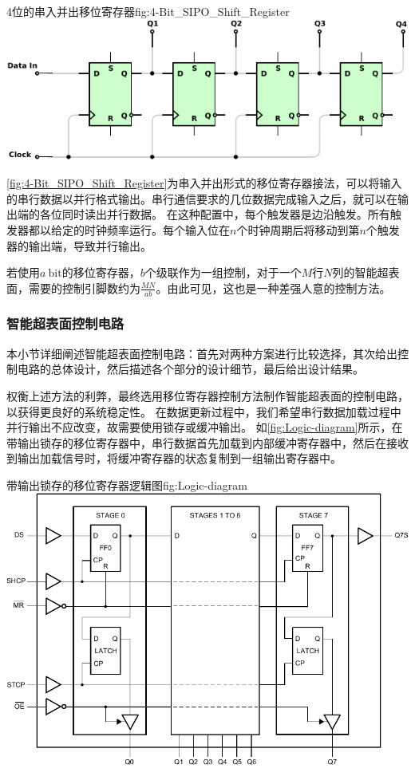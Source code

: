 \documentclass[supercite]{HustGraduPaper}
\begin{document}
\begin{generalfig}[htb]{4位的串入并出移位寄存器}{fig:4-Bit_SIPO_Shift_Register}
	\includegraphics[width=0.8\linewidth]{Figures/4-Bit_SIPO_Shift_Register.pdf}
\end{generalfig}

\autoref{fig:4-Bit_SIPO_Shift_Register}为串入并出形式的移位寄存器接法，可以将输入的串行数据以并行格式输出。串行通信要求的几位数据完成输入之后，就可以在输出端的各位同时读出并行数据。
在这种配置中，每个触发器是边沿触发。所有触发器都以给定的时钟频率运行。每个输入位在$n$个时钟周期后将移动到第$n$个触发器的输出端，导致并行输出。

若使用$a~\mathrm{bit}$的移位寄存器，$b$个级联作为一组控制，对于一个$M$行$N$列的智能超表面，需要的控制引脚数约为$\frac{MN}{ab}$。由此可见，这也是一种差强人意的控制方法。

\subsubsection{智能超表面控制电路}

本小节详细阐述智能超表面控制电路：首先对两种方案进行比较选择，其次给出控制电路的总体设计，然后描述各个部分的设计细节，最后给出设计结果。


权衡上述方法的利弊，最终选用移位寄存器控制方法制作智能超表面的控制电路，以获得更良好的系统稳定性。
在数据更新过程中，我们希望串行数据加载过程中并行输出不应改变，故需要使用锁存或缓冲输出。
如\autoref{fig:Logic-diagram}所示，在带输出锁存的移位寄存器中，串行数据首先加载到内部缓冲寄存器中，然后在接收到输出加载信号时，将缓冲寄存器的状态复制到一组输出寄存器中。

\begin{generalfig}[htb]{带输出锁存的移位寄存器逻辑图}{fig:Logic-diagram}
	\includegraphics[width=0.8\linewidth]{Figures/Logic-diagram.pdf}
\end{generalfig}
\end{document}
